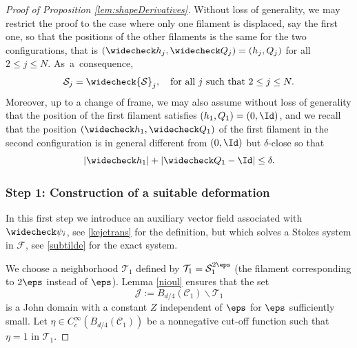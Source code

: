 \begin{proof}[Proof of Proposition \ref{lem:shapeDerivatives}]
Without loss of generality, we may restrict the proof to the case where only one filament is displaced, say the first one, so that the positions of the other filaments is the same for the two configurations, that is $(\widecheck h_j, \widecheck Q_j) = (h_j,Q_j)$ for all $2 \leq j \leq N$. As~a~consequence,
\begin{equation}
\label{lezautre}
{\mathcal S}_j = \widecheck {\mathcal S}_j, \quad\text{for all $j$ such that } 2 \leq j \leq N.
\end{equation}
Moreover, up to a change of frame, we may also assume without loss of generality that the position of the first filament satisfies $(h_1,Q_1) = (0,\Id)$, and we recall that the position $(\widecheck h_1, \widecheck Q_1)$ of the first filament in the second configuration is in general different from $(0,\Id)$ but $\delta$-close so that
\begin{equation} \label{delta-c}
|\widecheck h_1 | + |\widecheck Q_1 - \Id | \leq \delta.
\end{equation}

\subsubsection*{Step 1: Construction of a suitable deformation}
In this first step we introduce an auxiliary vector field associated with $\widecheck \psi_i$, see \eqref{kejetrans} for the definition, but which solves a Stokes system in $\mathcal F$, see \eqref{subtilde} for the exact system.

We choose a neighborhood $\mathcal T_1$ defined by $\mathcal T_1 = \mathcal S_1^{2\eps}$ (\ie the filament corresponding to $2 \eps$ instead of $\eps$). Lemma \ref{nioul} ensures that the set
\begin{equation} \label{J}
\mathcal J := B_{d/4}(\mathcal C_1) \smallsetminus \mathcal T_1
\end{equation}
is a John domain with a constant $Z$ independent of $\eps$ for $\eps$ sufficiently small.
Let $\eta \in C_c^{\infty}(B_{d/4}(\mathcal C_1))$ be a nonnegative cut-off function such that
$\eta = 1$ in $\mathcal T_1$.


\end{proof}
